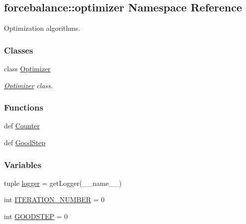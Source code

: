 \hypertarget{namespaceforcebalance_1_1optimizer}{\subsection{forcebalance\-:\-:optimizer \-Namespace \-Reference}
\label{namespaceforcebalance_1_1optimizer}
}


\-Optimization algorithms.  


\subsubsection*{\-Classes}
\begin{DoxyCompactItemize}
\item 
class \hyperlink{classforcebalance_1_1optimizer_1_1Optimizer}{\-Optimizer}
\begin{DoxyCompactList}\small\item\em \hyperlink{classforcebalance_1_1optimizer_1_1Optimizer}{\-Optimizer} class. \end{DoxyCompactList}\end{DoxyCompactItemize}
\subsubsection*{\-Functions}
\begin{DoxyCompactItemize}
\item 
def \hyperlink{namespaceforcebalance_1_1optimizer_ae1f6c649703a22b2f767a5f6bf53297b}{\-Counter}
\item 
def \hyperlink{namespaceforcebalance_1_1optimizer_ab43948ecf30c90d319e0c0b107fe484a}{\-Good\-Step}
\end{DoxyCompactItemize}
\subsubsection*{\-Variables}
\begin{DoxyCompactItemize}
\item 
tuple \hyperlink{namespaceforcebalance_1_1optimizer_a3a90d52ff4e74cd917ce709e53b330df}{logger} = get\-Logger(\-\_\-\-\_\-name\-\_\-\-\_\-)
\item 
int \hyperlink{namespaceforcebalance_1_1optimizer_a8b0e063c6ff704cbe779b65f400ff37e}{\-I\-T\-E\-R\-A\-T\-I\-O\-N\-\_\-\-N\-U\-M\-B\-E\-R} = 0
\item 
int \hyperlink{namespaceforcebalance_1_1optimizer_a638d98f2fea0c85ac05d0cf5f7efef84}{\-G\-O\-O\-D\-S\-T\-E\-P} = 0
\end{DoxyCompactItemize}


